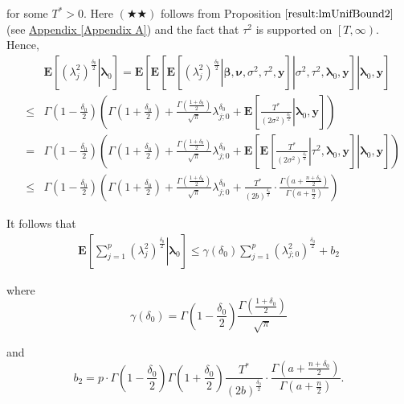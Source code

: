 \documentclass[noinfoline,11pt]{imsart}
\numberwithin{equation}{section}
\theoremstyle{plain}
\newcommand{\y}{\mathbf{y}}
\newcommand{\bl}{\boldsymbol{\lambda}}
\newcommand{\E}{\boldsymbol{E}}
\begin{document}
\noindent
for some $T^* > 0$. Here $(\bigstar\bigstar)$ follows from 
Proposition $\ref{result:lmUnifBound2}$ (see \hyperref[Appendix A]{Appendix \ref{Appendix A}}) and the fact that $\tau^2$ is supported on $\left[T,\infty\right)$. Hence,
\begin{eqnarray*}
& &   \E\left[\left.\left(\lambda_j^2\right)^{\frac{\delta_0}{2}}\right|\mathbf{\bl}_0\right]=\E\left[\left.\E\left[\left.\E\left[\left.\left(\lambda_j^2\right)^{\frac{\delta_0}{2}}\right|\boldsymbol{\beta,\nu},\sigma^2,\tau^2,\mathbf{\y}\right]\right|\sigma^2,\tau^2,\mathbf{\bl}_0,\mathbf{\y}\right]\right|\mathbf{\bl}_0,\mathbf{\y}\right] \\
   &\leq& \Gamma\left(1-\frac{\delta_0}{2}\right)\left(\Gamma\left(1+\frac{\delta_0}{2}\right)+\frac{\Gamma\left(\frac{1+\delta_0}{2}\right)}{\sqrt{\pi}}\lambda_{j;0}^{\delta_0}+\E\left[\left.\frac{T^*}{\left(2\sigma^2\right)^{\frac{\delta_0}{2}}}\right|\bl_0,\y\right]\right) \nonumber \\
   &=& \Gamma\left(1-\frac{\delta_0}{2}\right)\left(\Gamma\left(1+\frac{\delta_0}{2}\right)+\frac{\Gamma\left(\frac{1+\delta_0}{2}\right)}{\sqrt{\pi}}\lambda_{j;0}^{\delta_0}+\E\left[\left.\E\left[\left.\frac{T^*}{\left(2\sigma^2\right)^{\frac{\delta_0}{2}}}\right|\tau^2,\bl_0,\y\right]\right|\bl_0,\y\right]\right) \nonumber \\
   &\leq& \Gamma\left(1-\frac{\delta_0}{2}\right)\left(\Gamma\left(1+\frac{\delta_0}{2}\right)+\frac{\Gamma\left(\frac{1+\delta_0}{2}\right)}{\sqrt{\pi}}\lambda_{j;0}^{\delta_0}+\frac{T^*}{\left(2b\right)^{\frac{\delta_0}{2}}}\cdot\frac{\Gamma\left(a+\frac{n+\delta_0}{2}\right)}{\Gamma\left(a+\frac{n}{2}\right)}\right) 
\end{eqnarray*}

\noindent
It follows that 
\begin{eqnarray}\label{drift:2}
   \E\left[\left.\sum_{j=1}^p\left(\lambda_j^2\right)^{\frac{\delta_0}{2}}\right|\mathbf{\bl}_0\right]\leq \gamma\left(\delta_0\right)\sum_{j=1}^p\left(\lambda_{j;0}^2\right)^{\frac{\delta_0}{2}}+b_2
\end{eqnarray}

\noindent
where 
$$
\gamma\left(\delta_0\right)=\Gamma\left(1-\frac{\delta_0}{2}\right)\frac{\Gamma\left(\frac{1+\delta_0}{2}\right)}{\sqrt{\pi}}
$$

\noindent
and 
$$
b_2=p\cdot\Gamma\left(1-\frac{\delta_0}{2}\right)\Gamma\left(1+\frac{\delta_0}{2}\right)\frac{T^*}{\left(2b\right)^{\frac{\delta_0}{2}}}\cdot\frac{\Gamma\left(a+\frac{n+\delta_0}{2}\right)}{\Gamma\left(a+\frac{n}{2}\right)}. 
$$
\end{document}
